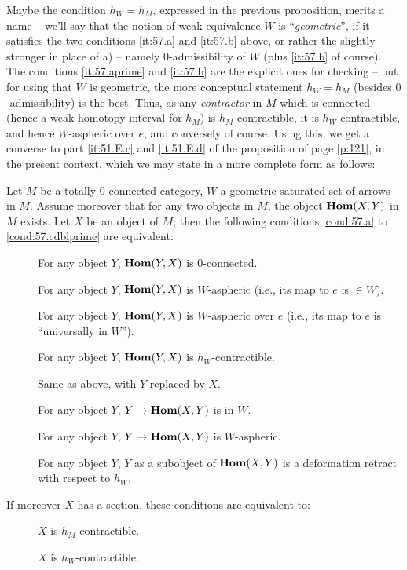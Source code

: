 Maybe the condition $h_W=h_M$, expressed in the previous proposition,
merits a name -- we'll say that the notion of weak equivalence $W$ is
``\emph{geometric}'', if it satisfies the two conditions \ref{it:57.a}
and \ref{it:57.b} above, or rather the slightly stronger
 in place of a) -- namely
$0$-admissibility of $W$ (plus \ref{it:57.b} of course). The
conditions \ref{it:57.aprime} and \ref{it:57.b} are the explicit ones
for checking -- but for using that $W$ is geometric, the more
conceptual statement $h_W=h_M$ (besides $0$-admissibility) is the
best. Thus, as any \emph{contractor} in $M$ which is connected (hence
a weak homotopy interval for $h_M$) is $h_M$-contractible, it is
$h_W$-contractible, and hence $W$-aspheric over $e$, and conversely of
course. Using this, we get a converse to part \ref{it:51.E.c}
and \ref{it:51.E.d} of the proposition of page
\ref{p:121}, in the present context, which we may state in a more
complete form as follows:
\begin{proposition}
  Let $M$ be a totally $0$-connected category, $W$ a geometric
  saturated set of arrows in $M$. Assume moreover that for any two
  objects in $M$, the object $\operatorname{\mathbf{Hom}}(X,Y)$ in $M$ exists. Let $X$ be an
  object of $M$, then the following conditions \textup{\ref{cond:57.a}} to
  \textup{\ref{cond:57.cdblprime}} are equivalent:
  \begin{description}
  \item[]
    For any object $Y$, $\operatorname{\mathbf{Hom}}(Y,X)$ is $0$-connected.
  \item[]
    For any object $Y$, $\operatorname{\mathbf{Hom}}(Y,X)$ is $W$-aspheric \textup(i.e., its
    map to $e$ is $\in W$\textup).
  \item[]
    For any object $Y$, $\operatorname{\mathbf{Hom}}(Y,X)$ is $W$-aspheric over $e$
    \textup(i.e., its map to $e$ is ``universally in $W$''\textup).
  \item[]
    For any object $Y$, $\operatorname{\mathbf{Hom}}(Y,X)$ is $h_W$-contractible.
  \item[%
    ]
    Same as above, with $Y$ replaced by $X$.
  \item[]
    For any object $Y$, $Y\to \operatorname{\mathbf{Hom}}(X,Y)$ is in $W$.
  \item[]
    For any object $Y$, $Y\to \operatorname{\mathbf{Hom}}(X,Y)$ is $W$-aspheric.
  \item[]
    For any object $Y$, $Y$ as a subobject of $\operatorname{\mathbf{Hom}}(X,Y)$ is a
    deformation retract with respect to $h_W$.
  \end{description}
  If moreover $X$ has a section, these conditions are equivalent to:
  \begin{description}
  \item[]
    $X$ is $h_M$-contractible.
  \item[]
    $X$ is $h_W$-contractible.
  \end{description}
\end{proposition}
